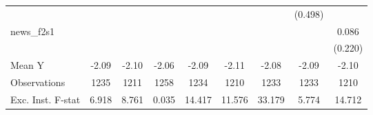 {\begin{tabular}{l*{8}{c}}
            &                     &                     &                     &                     &                     &                     &     (0.498)         &                     \\
\addlinespace
news\_f2s1   &                     &                     &                     &                     &                     &                     &                     &       0.086         \\
            &                     &                     &                     &                     &                     &                     &                     &     (0.220)         \\
\midrule
Mean Y      &       -2.09         &       -2.10         &       -2.06         &       -2.09         &       -2.11         &       -2.08         &       -2.09         &       -2.10         \\
Observations&        1235         &        1211         &        1258         &        1234         &        1210         &        1233         &        1233         &        1210         \\
Exc. Inst. F-stat&       6.918         &       8.761         &       0.035         &      14.417         &      11.576         &      33.179         &       5.774         &      14.712         \\
\bottomrule
\end{tabular}
}
